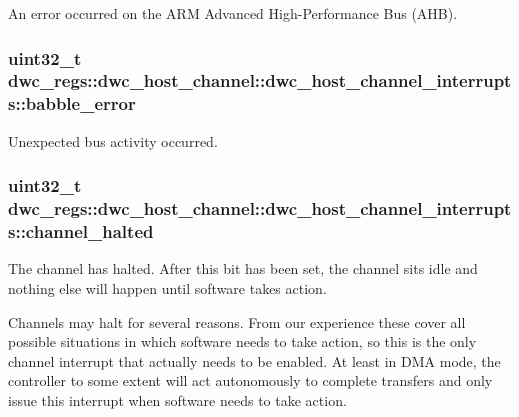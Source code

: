 An error occurred on the A\-R\-M Advanced High-\/\-Performance Bus (A\-H\-B). \hypertarget{uniondwc__regs_1_1dwc__host__channel_1_1dwc__host__channel__interrupts_a2b3f505c2a3ec5b0bc2c2f078f6cc33f}{
\subsubsection[{babble\-\_\-error}]{\setlength{\rightskip}{0pt plus 5cm}uint32\-\_\-t dwc\-\_\-regs\-::dwc\-\_\-host\-\_\-channel\-::dwc\-\_\-host\-\_\-channel\-\_\-interrupts\-::babble\-\_\-error}}\label{uniondwc__regs_1_1dwc__host__channel_1_1dwc__host__channel__interrupts_a2b3f505c2a3ec5b0bc2c2f078f6cc33f}
Unexpected bus activity occurred. \hypertarget{uniondwc__regs_1_1dwc__host__channel_1_1dwc__host__channel__interrupts_a5d5cf6f7761bbb8b9c4d81278a4d9db0}{
\subsubsection[{channel\-\_\-halted}]{\setlength{\rightskip}{0pt plus 5cm}uint32\-\_\-t dwc\-\_\-regs\-::dwc\-\_\-host\-\_\-channel\-::dwc\-\_\-host\-\_\-channel\-\_\-interrupts\-::channel\-\_\-halted}}\label{uniondwc__regs_1_1dwc__host__channel_1_1dwc__host__channel__interrupts_a5d5cf6f7761bbb8b9c4d81278a4d9db0}
The channel has halted. After this bit has been set, the channel sits idle and nothing else will happen until software takes action.

Channels may halt for several reasons. From our experience these cover all possible situations in which software needs to take action, so this is the only channel interrupt that actually needs to be enabled. At least in D\-M\-A mode, the controller to some extent will act autonomously to complete transfers and only issue this interrupt when software needs to take action.

